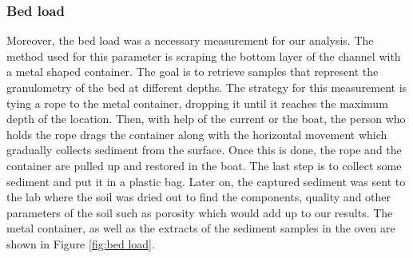 \subsubsection{Bed load}
Moreover, the bed load was a necessary measurement for our analysis. The method used for this parameter is scraping the bottom layer of the channel with a metal shaped container. The goal is to retrieve samples that represent the granulometry of the bed at different depths. 
The strategy for this measurement is tying a rope to the metal container, dropping it until it reaches the maximum depth of the location. Then, with help of the current or the boat, the person who holds the rope drags the container along with the horizontal movement which gradually collects sediment from the surface. Once this is done, the rope and the container are pulled up and restored in the boat. The last step is to collect some sediment and put it in a plastic bag.  Later on, the captured sediment was sent to the lab where the soil was dried out to find the components, quality and other parameters of the soil such as porosity which would add up to our results. The metal container, as well as the extracts of the sediment samples in the oven are shown in Figure \ref{fig:bed load}. 

